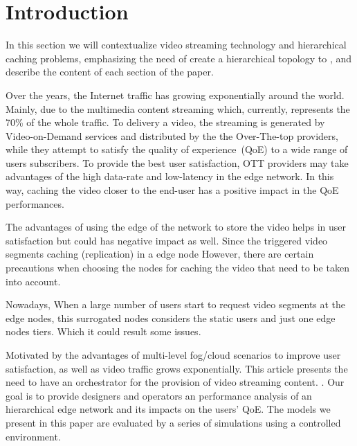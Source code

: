 \section{Introduction}
\label{sec:introduction}

{\color{blue} In this section we will contextualize video streaming technology and hierarchical caching problems, emphasizing the need of create a hierarchical topology to , and describe the content of each section of the paper.}

Over the years, the Internet traffic has growing exponentially around the world. Mainly, due to the multimedia content streaming which, currently, represents the 70\% of the whole traffic. To delivery a video, the streaming is generated by Video-on-Demand services and distributed by the the Over-The-top providers, while they attempt to satisfy the quality of experience~(QoE) to a wide range of users subscribers. To provide the best user satisfaction, OTT providers may take advantages of the high data-rate and low-latency in the edge network. In this way, caching the video closer to the end-user has a positive impact in the QoE performances.

The advantages of using the edge of the network to store the video helps in user satisfaction but could has negative impact as well. Since the triggered video segments caching (replication) in a edge node
However, there are certain precautions when choosing the nodes for caching the video that need to be taken into account. 

Nowadays, When a large number of users start to request video segments at the edge nodes, this surrogated nodes considers the static users and just one edge nodes tiers. Which it could result some issues. 

Motivated by the advantages of multi-level fog/cloud scenarios to improve user satisfaction, as well as video traffic grows exponentially. This article presents the need to have an orchestrator for the provision of video streaming content.
. Our goal is to provide designers and operators an performance analysis  of an hierarchical edge network and its impacts on the users' QoE. The models we present in this paper are evaluated by a series of simulations using a controlled environment.


